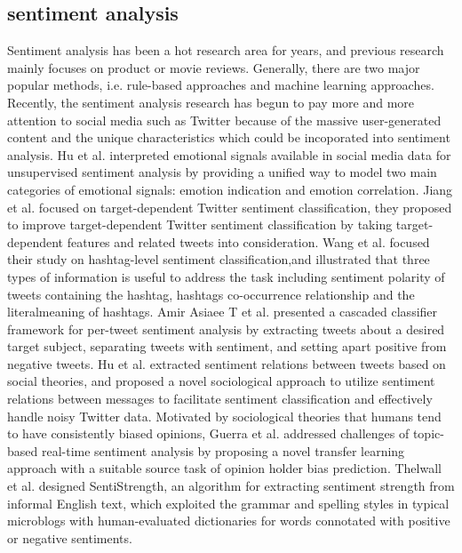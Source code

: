 \documentclass{acm_proc_article-sp}
\begin{document}
\subsection{sentiment analysis}
Sentiment analysis has been a hot research area for years, and previous research mainly focuses on product or movie reviews. 
Generally, there are two major popular methods, i.e. rule-based approaches and machine learning approaches. 
Recently, the sentiment analysis research has begun to pay more and more attention to social media such as Twitter because of the massive user-generated content and the unique characteristics which could be incoporated into sentiment analysis. 
Hu et al.\cite{Hu:2013www} interpreted emotional signals available in social media data for unsupervised sentiment analysis by providing a unified way to model two main categories of emotional signals: emotion indication and emotion correlation. 
Jiang et al.\cite{Jiang:2011TTS} focused on target-dependent Twitter sentiment classification, they proposed to improve target-dependent Twitter sentiment classification by taking target-dependent features and related tweets into consideration. 
Wang et al.\cite{Wang:2011TSA} focused their study on hashtag-level sentiment classification,and illustrated that three types of information is useful to address the task including sentiment polarity of tweets containing the hashtag, hashtags co-occurrence relationship and the literalmeaning of hashtags.
Amir Asiaee T et al.\cite{AsiaeeT:2012} presented a cascaded classifier framework for per-tweet sentiment analysis by extracting tweets about a desired target subject, separating tweets with sentiment, and setting apart positive from negative tweets.
Hu et al.\cite{Hu:2013ESR} extracted sentiment relations between tweets based on social theories, and proposed a novel sociological approach to utilize sentiment relations between messages to facilitate sentiment classification and effectively handle noisy Twitter data.
Motivated by sociological theories that humans tend to have consistently biased opinions, Guerra et al.\cite{CalaisGuerra:2011BOT} addressed challenges of topic-based real-time sentiment analysis by proposing a novel transfer learning approach with a suitable source task of opinion holder bias prediction.
Thelwall et al.\cite{Thelwall:2010SSS,Thelwall:2012SSD} designed SentiStrength, an algorithm for extracting sentiment strength from informal English text, which exploited the grammar and spelling styles in typical microblogs with human-evaluated dictionaries for words connotated with positive or negative sentiments.
\end{document}
